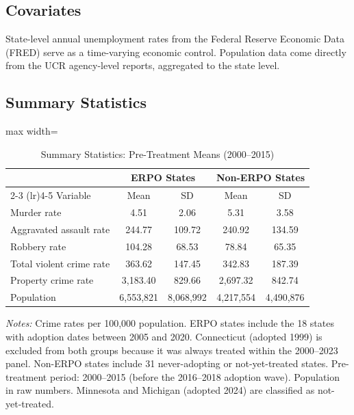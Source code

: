 \documentclass[12pt]{article}
\begin{document}
\subsection{Covariates}

State-level annual unemployment rates from the Federal Reserve Economic Data (FRED) serve as a time-varying economic control. Population data come directly from the UCR agency-level reports, aggregated to the state level.

\subsection{Summary Statistics}

\begin{table}[H]
\centering
\caption{Summary Statistics: Pre-Treatment Means (2000--2015)}
\label{tab:summary}
\begin{adjustbox}{max width=\textwidth}
\begin{threeparttable}
\begin{tabular}{l cc cc}
\toprule
& \multicolumn{2}{c}{ERPO States} & \multicolumn{2}{c}{Non-ERPO States} \\
\cmidrule(lr){2-3} \cmidrule(lr){4-5}
Variable & Mean & SD & Mean & SD \\
\midrule
Murder rate & 4.51 & 2.06 & 5.31 & 3.58 \\
Aggravated assault rate & 244.77 & 109.72 & 240.92 & 134.59 \\
Robbery rate & 104.28 & 68.53 & 78.84 & 65.35 \\
Total violent crime rate & 363.62 & 147.45 & 342.83 & 187.39 \\
Property crime rate & 3,183.40 & 829.66 & 2,697.32 & 842.74 \\
Population & 6,553,821 & 8,068,992 & 4,217,554 & 4,490,876 \\
\bottomrule
\end{tabular}
\begin{tablenotes}[flushleft]
\small
\item \textit{Notes:} Crime rates per 100,000 population. ERPO states include the 18 states with adoption dates between 2005 and 2020. Connecticut (adopted 1999) is excluded from both groups because it was always treated within the 2000--2023 panel. Non-ERPO states include 31 never-adopting or not-yet-treated states. Pre-treatment period: 2000--2015 (before the 2016--2018 adoption wave). Population in raw numbers. Minnesota and Michigan (adopted 2024) are classified as not-yet-treated.
\end{tablenotes}
\end{threeparttable}
\end{adjustbox}
\end{table}
\end{document}

